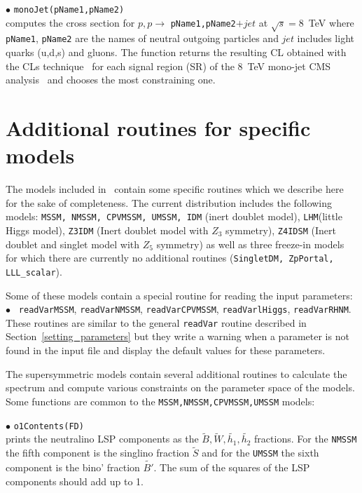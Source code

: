 \documentclass[12pt,a4paper]{article}
\begin{document}
\noi$\bullet$   \verb|monoJet(pName1,pName2)|\\
computes the cross section for $p,p\rightarrow$ \verb|pName1,pName2|$ +jet$ at $\sqrt{s}=8$~TeV 
where \verb|pName1|, \verb|pName2| are the names of neutral outgoing particles and $jet$ includes light quarks (u,d,s)  and gluons.
The function returns  the resulting  CL  obtained with the CLs technique~\cite{Read:2002hq,Read:2000ru} for each  signal region (SR) of the 8~TeV mono-jet CMS analysis~\cite{Khachatryan:2014rra} and chooses the most constraining one.



\section{Additional routines for specific models}
The models included in \micro\ contain some specific routines
which we describe here for the sake of completeness. The current 
distribution includes the following models: {\tt MSSM, NMSSM, CPVMSSM, UMSSM, IDM}  (inert doublet model), {\tt LHM}(little Higgs model),
  {\tt Z3IDM} (Inert doublet model with $Z_3$ symmetry), {\tt Z4IDSM} (Inert doublet and singlet model with $Z_5$ symmetry) as well as three freeze-in models for which there are currently no additional routines (\verb|SingletDM, ZpPortal, LLL_scalar|).

Some of these models contain a special routine for reading the input parameters:\\
$\bullet$ \verb| readVarMSSM|, \verb|readVarNMSSM|,  \verb|readVarCPVMSSM|,
\verb|readVarlHiggs|, \verb|readVarRHNM|.\\
 These routines  are similar to the general 
\verb|readVar| routine described  in Section~\ref{setting_parameters}
but  they write a warning when a parameter is not found in the 
input file and display the default values for these parameters.

The supersymmetric models contain several additional routines to calculate the spectrum
and compute various constraints on the parameter space of the models. Some functions are
common to the \verb|MSSM,NMSSM,CPVMSSM,UMSSM| models: 


\noindent
$\bullet$  \verb|o1Contents(FD)|\\
prints  the neutralino LSP components as the  $\tilde{B},\tilde{W},
\tilde{h_1},\tilde{h_2}$ fractions. For the {\tt NMSSM} the fifth component is
the singlino fraction  $\tilde{S}$ and for the {\tt UMSSM} the sixth component is
the bino' fraction  $\tilde{B'}$. The sum of the squares of the LSP components
should add up to 1. 
\end{document}
